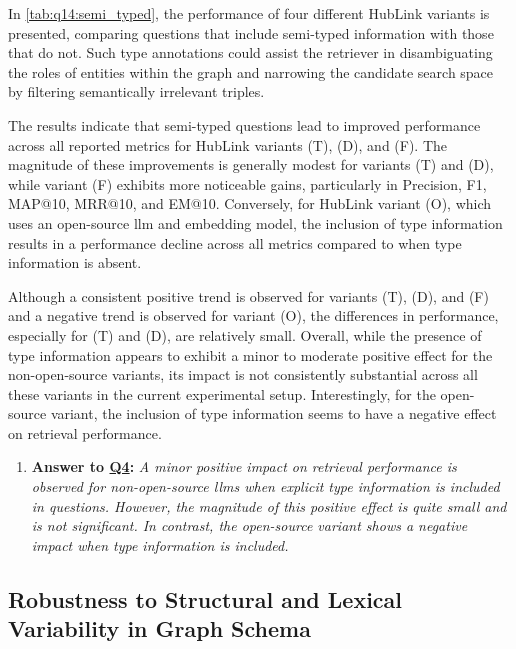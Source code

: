 In \autoref{tab:q14:semi_typed}, the performance of four different HubLink variants is presented, comparing questions that include semi-typed information with those that do not. Such type annotations could assist the retriever in disambiguating the roles of entities within the graph and narrowing the candidate search space by filtering semantically irrelevant triples.

The results indicate that semi-typed questions lead to improved performance across all reported metrics for HubLink variants (T), (D), and (F). The magnitude of these improvements is generally modest for variants (T) and (D), while variant (F) exhibits more noticeable gains, particularly in Precision, F1, MAP@10, MRR@10, and EM@10. Conversely, for HubLink variant (O), which uses an open-source \gls{llm} and embedding model, the inclusion of type information results in a performance decline across all metrics compared to when type information is absent.

Although a consistent positive trend is observed for variants (T), (D), and (F) and a negative trend is observed for variant (O), the differences in performance, especially for (T) and (D), are relatively small. Overall, while the presence of type information appears to exhibit a minor to moderate positive effect for the non-open-source variants, its impact is not consistently substantial across all these variants in the current experimental setup. Interestingly, for the open-source variant, the inclusion of type information seems to have a negative effect on retrieval performance.

\begin{enumerate}[label={}]
    \item \textbf{Answer to \hyperref[sec:evaluation_gqm_plan]{Q4}:} \textit{A minor positive impact on retrieval performance is observed for non-open-source \glspl{llm} when explicit type information is included in questions. However, the magnitude of this positive effect is quite small and is not significant. In contrast, the open-source variant shows a negative impact when type information is included.}
\end{enumerate}

\subsection{Robustness to Structural and Lexical Variability in Graph Schema}
\label{sec:evaluation_robustness_to_structural}


